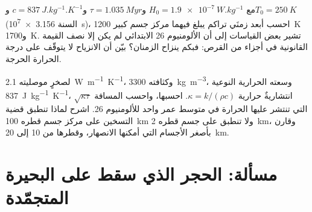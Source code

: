 \begin{exercise}[$\star\star\star$]\label{exo:b2:planet-formation-meteorites:11}
مع $H_0 = \qty{1.9e-7}{W.kg^{-1}}$ و$\tau = \qty{1.035}{Myr}$
و$c = \qty{837}{J.kg^{-1}.K^{-1}}$ و$T_0 = \qty{250}{K}$ (السنة
\qty{3.156e7}{s})، احسب أبعد زمنَي تراكم يبلغ فيهما مركز
جسم كبير \qty{1200}{K} و\qty{1700}{K}. تشير بعض القياسات إلى أن
الألومنيوم 26 الابتدائي لم يكن إلا نصف القيمة القانونية في أجزاء من القرص:
فبكم ينزاح الزمنان؟ بيّن أن الانزياح لا يتوقّف على
درجة الحرارة الحرجة.
\end{exercise}

\begin{exercise}[$\star\star\star$]\label{exo:b2:planet-formation-meteorites:12}
لصخرٍ موصليته \qty{2.1}{W.m^{-1}.K^{-1}}، وكثافته
\qty{3300}{kg.m^{-3}}، وسعته الحرارية النوعية \qty{837}{J.kg^{-1}.K^{-1}}،
انتشاريةٌ حرارية $\kappa = k/(\rho c)$. احسبها، واحسب المسافة
$\sqrt{\kappa\tau}$ التي تنتشر عليها الحرارة في متوسط عمر واحد للألومنيوم 26.
اشرح لماذا تنطبق قضية التسخين على مركز جسم قطره
\qty{100}{km} ولا تنطبق على جسم قطره \qty{2}{km}، وقارن بأصغر
الأجسام التي أمكنها الانصهار، وقطرها من 10 إلى \qty{20}{km}.
\end{exercise}

\section{مسألة: الحجر الذي سقط على البحيرة المتجمّدة}

